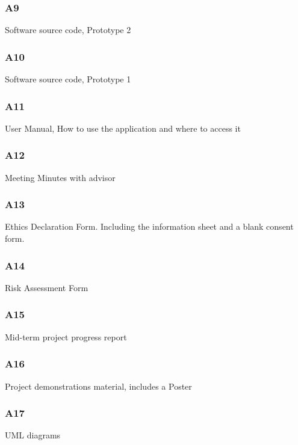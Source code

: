 \subsubsection{A9} \label{A9}
Software source code, Prototype 2

\subsubsection{A10} \label{A10}
Software source code, Prototype 1

\subsubsection{A11} \label{A11}
User Manual, How to use the application and where to access it

\subsubsection{A12} \label{A12}
Meeting Minutes with advisor

\subsubsection{A13} \label{A13}
Ethics Declaration Form. Including the information sheet and a blank consent form.

\subsubsection{A14} \label{A14}
Risk Assessment Form

\subsubsection{A15} \label{A15}
Mid-term project progress report

\subsubsection{A16} \label{A16}
Project demonstrations material, includes a Poster

\subsubsection{A17} \label{A17}
UML diagrams